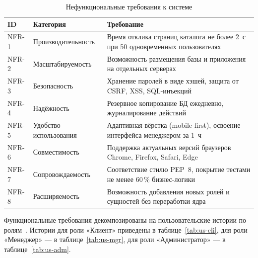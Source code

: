 \documentclass[14pt, a4paper]{extarticle}
\begin{document}
\begin{table}[ht!]
\caption{Нефункциональные требования к системе}
\label{tab:nfr}
\small
\begin{tabularx}{\textwidth}{|>{\centering\arraybackslash}p{}|>{\RaggedRight\arraybackslash}p{}|>{\RaggedRight\arraybackslash}X|}
\hline
\textbf{ID} & \textbf{Категория} & \textbf{Требование} \\ \hline
NFR-1 & Производительность & Время отклика страниц каталога не более 2~с при 50 одновременных пользователях \\ \hline
NFR-2 & Масштабируемость & Возможность размещения базы и приложения на отдельных серверах \\ \hline
NFR-3 & Безопасность & Хранение паролей в виде хэшей, защита от CSRF, XSS, SQL-инъекций \\ \hline
NFR-4 & Надёжность & Резервное копирование БД ежедневно, журналирование действий \\ \hline
NFR-5 & Удобство использования & Адаптивная вёрстка (mobile first), освоение интерфейса менеджером за 1~ч \\ \hline
NFR-6 & Совместимость & Поддержка актуальных версий браузеров Chrome, Firefox, Safari, Edge \\ \hline
NFR-7 & Сопровождаемость & Соответствие стилю PEP~8, покрытие тестами не менее 60\,\% бизнес-логики \\ \hline
NFR-8 & Расширяемость & Возможность добавления новых ролей и сущностей без переработки ядра \\ \hline
\end{tabularx}
\end{table}

Функциональные требования декомпозированы на пользовательские истории по ролям~\cite{cohn2004}. Истории для роли «Клиент» приведены в таблице~\ref{tab:us-cli}, для роли «Менеджер» --- в таблице~\ref{tab:us-mgr}, для роли «Администратор» --- в таблице~\ref{tab:us-adm}.
\end{document}
